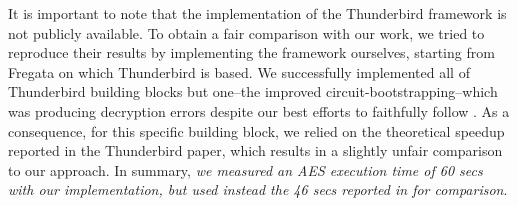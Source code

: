 It is important to note that the implementation of the Thunderbird framework is not publicly available. To obtain a fair comparison with our work, we tried to reproduce their results by implementing the framework ourselves, starting from Fregata on which Thunderbird is based. We successfully implemented all of Thunderbird building blocks but one--the improved circuit-bootstrapping--which was producing decryption errors despite our best efforts to faithfully follow \cite{TCHES:WLWLLW24}. As a consequence, for this specific building block, we relied on the theoretical speedup reported in the Thunderbird paper, which results in a slightly unfair comparison to our approach. In summary, \emph{we measured an AES execution time of 60 secs with our implementation, but used instead the 46 secs reported in \cite{TCHES:WLWLLW24} for comparison}. 

\begin{comment}
\DT{Despite our best efforts to faithfully follow the Thunderbird paper, our implementation of their framework} (using the most efficient \texttt{FreeXOR} variant) still induced unexpected decryption errors. \DT{Looking for comparison figures, we still executed it and obtained an AES execution in 60 secs, which was a bit slower than the 46 seconds reported by the authors.} This hints that our machine is approximately 1.3 times slower than the one used in their paper (a ratio which is further confirmed by lower-grain unitary measurements on the circuit bootstrapping alone). \DT{Finally, as our implementation did not always produce correct results, we choose not to rely on it for comparison.} 
As a consequence, for this specific building block only, we relied on the theoretical speedup reported in the Thunderbird paper, which results in a slightly unfair comparison to our approach. \emph{As a result, comparing the execution times of our new framework to those reported in the Thunderbird paper (i.e. 46 secs) may slightly disadvantage \hippo.}
\NB{On a dit dans le rebuttal qu'on améliorerait cette section} \DT{J'ai fait quelques ajouts en partant de notre réponse de rebuttal, mais je ne sais pas si c'est vraiment plus clair qu'auparavant...}
\end{comment}


